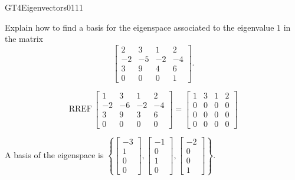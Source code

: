 \begin{exercise}{GT4}{Eigenvectors}{0111} 
\begin{exerciseStatement} 

Explain how to find a basis for the eigenspace associated to the eigenvalue \(1\) in the matrix \[\left[\begin{array}{cccc}
2 & 3 & 1 & 2 \\
-2 & -5 & -2 & -4 \\
3 & 9 & 4 & 6 \\
0 & 0 & 0 & 1
\end{array}\right].\]

 \end{exerciseStatement}
 \begin{exerciseAnswer} 

\[\mathrm{RREF}\,\left[\begin{array}{cccc}
1 & 3 & 1 & 2 \\
-2 & -6 & -2 & -4 \\
3 & 9 & 3 & 6 \\
0 & 0 & 0 & 0
\end{array}\right]=\left[\begin{array}{cccc}
1 & 3 & 1 & 2 \\
0 & 0 & 0 & 0 \\
0 & 0 & 0 & 0 \\
0 & 0 & 0 & 0
\end{array}\right]\]

 

A basis of the eigenspace is \(\left\{ \left[\begin{array}{c}
-3 \\
1 \\
0 \\
0
\end{array}\right] , \left[\begin{array}{c}
-1 \\
0 \\
1 \\
0
\end{array}\right] , \left[\begin{array}{c}
-2 \\
0 \\
0 \\
1
\end{array}\right] \right\}\).

 \end{exerciseAnswer}
 \end{exercise}


\newpage




